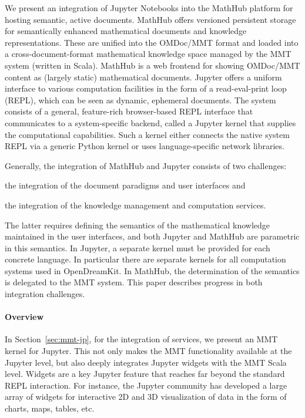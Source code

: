 We present an integration of Jupyter Notebooks into the MathHub platform for hosting semantic, active documents.
MathHub offers versioned persistent storage for semantically enhanced mathematical documents and knowledge representations.
These are unified into the OMDoc/MMT format and loaded into a cross-document-format mathematical knowledge space managed by the MMT system (written in Scala).  
MathHub is a web frontend for showing OMDoc/MMT content as (largely static) mathematical documents.
Jupyter offers a uniform interface to various computation facilities in the form of a read-eval-print loop (REPL), which can be seen as dynamic, ephemeral documents.
The system consists of a general, feature-rich browser-based REPL interface that communicates to a system-specific backend, called a Jupyter kernel that supplies the computational capabilities.
Such a kernel either connects the native system REPL via a generic Python kernel or uses language-specific network libraries. 

Generally, the integration of MathHub and Jupyter consists of two challenges:
\begin{compactenum}[\em i\rm )]
\item the integration of the document paradigms and user interfaces 
and
\item the integration of the knowledge management and computation services.
\end{compactenum}
The latter requires defining the semantics of the mathematical knowledge maintained in the user interfaces, and both Jupyter and MathHub are parametric in this semantics.
In Jupyter, a separate kernel must be provided for each concrete language.
In particular there are separate kernels for all computation systems used in OpenDreamKit.
In MathHub, the determination of the semantics is delegated to the MMT system. This paper describes progress in both integration challenges.

\paragraph{Overview} In Section~\ref{sec:mmt-jp}, for the integration of services, we present an MMT kernel for Jupyter.
This not only makes the MMT functionality available at the Jupyter level, but also deeply integrates Jupyter widgets with the MMT Scala level.
Widgets are a key Jupyter feature that reaches far beyond the standard REPL interaction.
For instance, the Jupyter community has developed a large array of widgets for interactive 2D and 3D visualization of data in the form of charts, maps, tables, etc.

